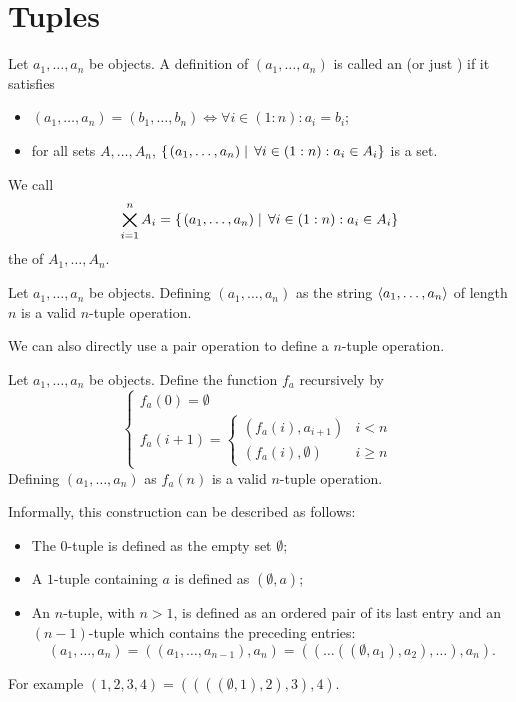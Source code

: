 \section{Tuples}
\begin{definition}
Let $a_1, \ldots, a_n$ be objects. A definition of $(a_1, \ldots, a_n)$ is called an  (or just ) if it satisfies
\begin{itemize}
\item $(a_1, \ldots, a_n) = (b_1, \ldots, b_n) \iff \forall i\in (1:n): a_i=b_i$;
\item for all sets $A,\ldots, A_n$, $\left\{\left. (a_1,\ldots, a_n) \;\right|\; \forall i\in (1:n): a_i \in A_i \right\}$ is a set.
\end{itemize}
We call
\[ \bigtimes_{i=1}^nA_i = \left\{\left. (a_1,\ldots, a_n) \;\right|\; \forall i\in (1:n): a_i \in A_i \right\} \]
the  of $A_1,\ldots, A_n$.
\end{definition}

\begin{proposition} \label{pairNTupleDefinition}
Let $a_1, \ldots, a_n$ be objects. Defining $(a_1, \ldots, a_n)$ as the string $\langle a_1, \ldots, a_n \rangle$ of length $n$ is a valid $n$-tuple operation.
\end{proposition}

We can also directly use a pair operation to define a $n$-tuple operation.
\begin{proposition}
Let $a_1, \ldots, a_n$ be objects. Define the function $f_a$ recursively by
\[ \begin{cases}
f_a(0) = \emptyset \\
f_a(i+1) = \begin{cases}
(f_a(i), a_{i+1}) & i < n \\
(f_a(i), \emptyset) & i \geq n
\end{cases}
\end{cases} \]
Defining $(a_1, \ldots, a_n)$ as $f_a(n)$ is a valid $n$-tuple operation.
\end{proposition}

Informally, this construction can be described as follows:
\begin{itemize}
\item The $0$-tuple is defined as the empty set $\emptyset$;
\item A $1$-tuple containing $a$ is defined as $(\emptyset, a)$;
\item An $n$-tuple, with $n > 1$, is defined as an ordered pair of its last entry and an $(n - 1)$-tuple which contains the preceding entries:
\[ (a_1, \ldots, a_n) = ((a_1, \ldots, a_{n-1}), a_n) = ((\ldots((\emptyset, a_1), a_2), \ldots), a_n). \]
\end{itemize}
For example $(1,2,3,4) = ((((\emptyset, 1), 2), 3), 4)$.

